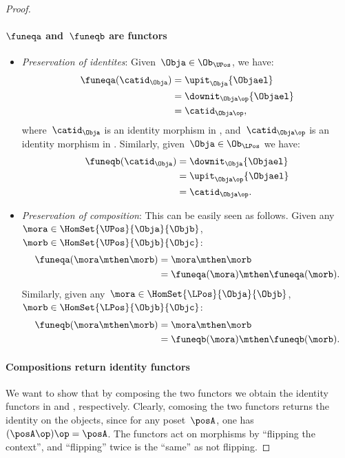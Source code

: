 \begin{proof}
\paragraph*{$\funeqa$ and~$\funeqb$ are functors}
\begin{itemize}
    \item \emph{Preservation of identites}: Given~$\Obja\in \Ob_\UPos$, we have:
    \begin{equation*}
        \begin{aligned}
            \funeqa(\catid_\Obja)&=\upit_\Obja\{\Objael\}\\
            &=\downit_{\Obja\op}\{\Objael\}\\
            &=\catid_{\Obja\op},
        \end{aligned}
    \end{equation*}
where~$\catid_\Obja$ is an identity morphism in \UPos, and~$\catid_{\Obja\op}$ is an identity morphism in \LPos. Similarly, given~$\Obja\in \Ob_\LPos$ we have:
\begin{equation*}
    \begin{aligned}
    \funeqb(\catid_\Obja)&=\downit_\Obja\{\Objael\}\\
    &=\upit_{\Obja\op}\{\Objael\}\\
    &=\catid_{\Obja\op}.
    \end{aligned}
\end{equation*}
\item \emph{Preservation of composition}: This can be easily seen as follows. Given any~$\mora\in \HomSet{\UPos}{\Obja}{\Objb}$,~$\morb\in \HomSet{\UPos}{\Objb}{\Objc}$:
\begin{equation*}
    \begin{aligned}
    \funeqa(\mora \mthen \morb)&=\mora \mthen \morb\\
    &=\funeqa(\mora)\mthen \funeqa(\morb).
    \end{aligned}
\end{equation*}
Similarly, given any~$\mora\in \HomSet{\LPos}{\Obja}{\Objb}$,~$\morb\in \HomSet{\LPos}{\Objb}{\Objc}$:
\begin{equation*}
    \begin{aligned}
    \funeqb(\mora \mthen \morb)&=\mora \mthen \morb\\
    &=\funeqb(\mora)\mthen \funeqb(\morb).
    \end{aligned}
\end{equation*}
\end{itemize}
\paragraph*{Compositions return identity functors}
We want to show that by composing the two functors we obtain the identity functors in \UPos and \LPos, respectively. Clearly, comosing the two functors returns the identity on the objects, since for any poset~$\posA$, one has~$(\posA\op)\op=\posA$. The functors act on morphisms by ``flipping the context'', and ``flipping'' twice is the ``same'' as not flipping.
\end{proof}

